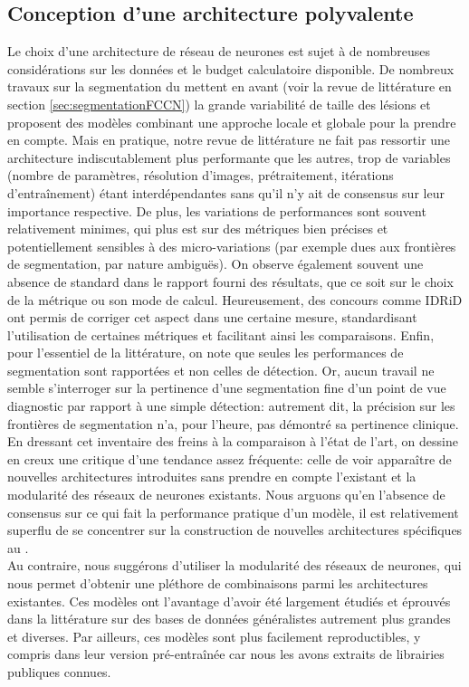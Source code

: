 \subsection{Conception d'une architecture polyvalente}
\label{sec:segConceptionArchitecture}
Le choix d'une architecture de réseau de neurones est sujet à de nombreuses considérations sur les données et le budget calculatoire disponible. De nombreux travaux sur la segmentation du \fundus{} mettent en avant (voir la revue de littérature en section \ref{sec:segmentationFCCN}) la grande variabilité de taille des lésions et proposent des modèles combinant une approche locale et globale pour la prendre en compte. Mais en pratique, notre revue de littérature ne fait pas ressortir une architecture indiscutablement plus performante que les autres, trop de variables (nombre de paramètres, résolution d'images, prétraitement, itérations d'entraînement) étant interdépendantes sans qu'il n'y ait de consensus sur leur importance respective. De plus, les variations de performances sont souvent relativement minimes, qui plus est sur des métriques bien précises et potentiellement sensibles à des micro-variations (par exemple dues aux frontières de segmentation, par nature ambiguës). On observe également souvent une absence de standard dans le rapport fourni des résultats, que ce soit sur le choix de la métrique ou son mode de calcul. Heureusement, des concours comme \ac{IDRiD} ont permis de corriger cet aspect dans une certaine mesure, standardisant l'utilisation de certaines métriques et facilitant ainsi les comparaisons. Enfin, pour l'essentiel de la littérature, on note que seules les performances de segmentation sont rapportées et non celles de détection. Or, aucun travail ne semble s'interroger sur la pertinence d'une segmentation fine d'un point de vue diagnostic par rapport à une simple détection: autrement dit, la précision sur les frontières de segmentation n'a, pour l'heure, pas démontré sa pertinence clinique. 
\\
En dressant cet inventaire des freins à la comparaison à l'état de l'art, on dessine en creux une critique d'une tendance assez fréquente: celle de voir apparaître de nouvelles architectures introduites sans prendre en compte l'existant et la modularité des réseaux de neurones existants. Nous arguons qu'en l'absence de consensus sur ce qui fait la performance pratique d'un modèle, il est relativement superflu de se concentrer sur la construction de nouvelles architectures spécifiques au \fundus.
\\
Au contraire, nous suggérons d'utiliser la modularité des réseaux de neurones, qui nous permet d'obtenir une pléthore de combinaisons parmi les architectures existantes. Ces modèles ont l'avantage d'avoir été largement étudiés et éprouvés dans la littérature sur des bases de données généralistes autrement plus grandes et diverses. Par ailleurs, ces modèles sont plus facilement reproductibles, y compris dans leur version pré-entraînée car nous les avons extraits de librairies publiques connues.
